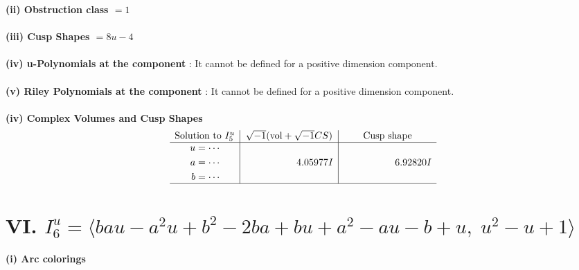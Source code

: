 \documentclass[1p]{elsarticle_modified}
\theoremstyle{definition}
\newcommand{\I}{\sqrt{-1}}
\begin{document}
\flushleft \textbf{(ii) Obstruction class $= 1$}\\~\\
\flushleft \textbf{(iii) Cusp Shapes $= 8 u-4$}\\~\\
\flushleft \textbf{(iv) u-Polynomials at the component} : It cannot be defined for a positive dimension component.\\~\\
\flushleft \textbf{(v) Riley Polynomials at the component} : It cannot be defined for a positive dimension component.\\~\\
\newpage\flushleft \textbf{(iv) Complex Volumes and Cusp Shapes}
$$\begin{array}{c|c|c} 
\text{Solution to }I^u_{5}& \I (\text{vol} + \sqrt{-1}CS) & \text{Cusp shape}\\
 \hline 
\begin{aligned}
u &= \cdots \\
a &= \cdots \\
b &= \cdots\end{aligned}
 & \phantom{-0.000000 -}4.05977 I & \phantom{-0.000000 -}6.92820 I\\
 \hline 
 \end{array}
$$\newpage\renewcommand{\arraystretch}{1}
\centering \section*{VI. $I^u_{6}= \langle b a u- a^2 u+b^2-2 b a+b u+a^2- a u- b+u,\;u^2- u+1 \rangle$}
\flushleft \textbf{(i) Arc colorings}\\
\end{document}
